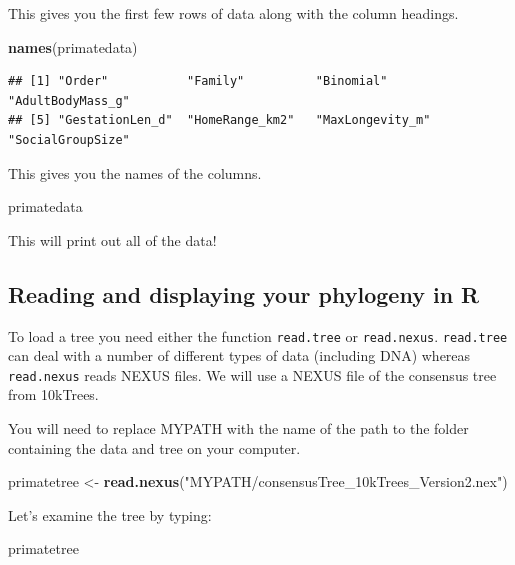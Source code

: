 \documentclass[12pt]{article}
\newcommand{\KeywordTok}[1]{\textcolor[rgb]{0.13,0.29,0.53}{\textbf{{#1}}}}
\newcommand{\StringTok}[1]{\textcolor[rgb]{0.31,0.60,0.02}{{#1}}}
\newcommand{\NormalTok}[1]{{#1}}
\begin{document}
This gives you the first few rows of data along with the column
headings.

\begin{snugshade}
\begin{Highlighting}[]
\KeywordTok{names}\NormalTok{(primatedata)}
\end{Highlighting}
\end{snugshade}

\begin{verbatim}
## [1] "Order"           "Family"          "Binomial"        "AdultBodyMass_g"
## [5] "GestationLen_d"  "HomeRange_km2"   "MaxLongevity_m"  "SocialGroupSize"
\end{verbatim}

This gives you the names of the columns.

\begin{snugshade}
\begin{Highlighting}[]
\NormalTok{primatedata}
\end{Highlighting}
\end{snugshade}

This will print out all of the data!

\subsection{Reading and displaying your phylogeny in R}

To load a tree you need either the function \texttt{read.tree} or \texttt{read.nexus}.
\texttt{read.tree} can deal with a number of different types of data (including
DNA) whereas \texttt{read.nexus} reads NEXUS files. We will use a NEXUS file of
the consensus tree from 10kTrees.

\begin{framed}
You will need to replace MYPATH with the name of the path to the folder containing the data and tree on your computer.
\end{framed}

\begin{snugshade}
\begin{Highlighting}[]
\NormalTok{primatetree <-}\StringTok{ }\KeywordTok{read.nexus}\NormalTok{(}\StringTok{"MYPATH/consensusTree_10kTrees_Version2.nex"}\NormalTok{)}
\end{Highlighting}
\end{snugshade}

Let's examine the tree by typing:

\begin{snugshade}
\begin{Highlighting}[]
\NormalTok{primatetree}
\end{Highlighting}
\end{snugshade}
\end{document}

